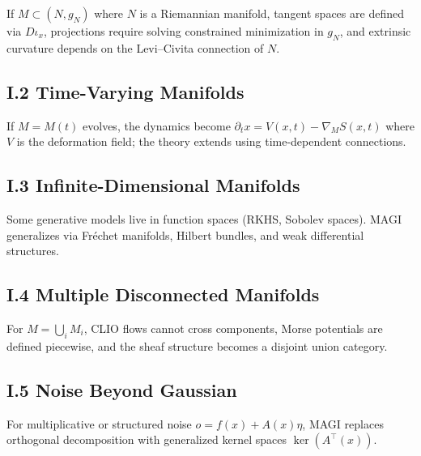 \documentclass[11pt,a4paper,twocolumn]{article}
\begin{document}
If $M \subset (N,g_N)$ where $N$ is a Riemannian manifold, tangent
spaces are defined via $D\iota_x$, projections require solving
constrained minimization in $g_N$, and extrinsic curvature depends on
the Levi--Civita connection of $N$.

\subsection*{I.2 Time-Varying Manifolds}

If $M = M(t)$ evolves, the dynamics become
$\partial_t x = V(x,t) - \nabla_M S(x,t)$
where $V$ is the deformation field; the theory extends using
time-dependent connections.

\subsection*{I.3 Infinite-Dimensional Manifolds}

Some generative models live in function spaces (RKHS, Sobolev spaces).
MAGI generalizes via Fréchet manifolds, Hilbert bundles, and weak
differential structures.

\subsection*{I.4 Multiple Disconnected Manifolds}

For $M = \bigcup_i M_i$, CLIO flows cannot cross components, Morse
potentials are defined piecewise, and the sheaf structure becomes a
disjoint union category.

\subsection*{I.5 Noise Beyond Gaussian}

For multiplicative or structured noise $o = f(x) + A(x)\eta$, MAGI
replaces orthogonal decomposition with generalized kernel spaces
$\ker(A^\top(x))$.

\end{document}
